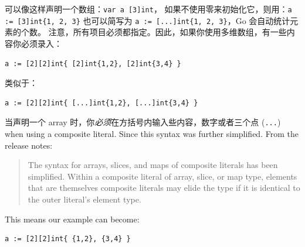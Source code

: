 可以像这样声明一个数组：\lstinline{var a [3]int}，
如果不使用零来初始化它，则用：\lstinline|a := [3]int{1, 2, 3}| 也可以简写为
\lstinline|a := [...]int{1, 2, 3}|，Go 会自动统计元素的个数。
注意，所有项目必须都指定。因此，如果你使用多维数组，有一些内容你必须录入：
\begin{lstlisting}
a := [2][2]int{ [2]int{1,2}, [2]int{3,4} }
\end{lstlisting}
类似于：
\begin{lstlisting}
a := [2][2]int{ [...]int{1,2}, [...]int{3,4} }
\end{lstlisting}
当声明一个 array 时，你\emph{必须}在方括号内输入些内容，数字或者三个点
(\verb|...|)
when using a composite literal. 
Since  this syntax was further simplified.
From the release notes:
\begin{quote}
The syntax for arrays, slices, and maps of composite literals has been
simplified. Within a composite literal of array, slice, or map type, elements
that are themselves composite literals may elide the type if it is identical to
the outer literal's element type. 
\end{quote}
This means our example can become:
\begin{lstlisting}
a := [2][2]int{ {1,2}, {3,4} }
\end{lstlisting}

